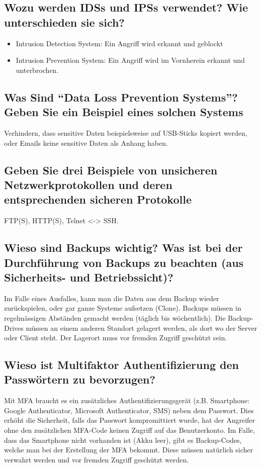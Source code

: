 \subsection*{Wozu werden IDSs und IPSs verwendet? Wie unterschieden sie sich?}
\begin{itemize}
    \item Intrusion Detection System: Ein Angriff wird erkannt und geblockt
    \item Intrusion Prevention System: Ein Angriff wird im Vornherein erkannt und unterbrochen.
\end{itemize}

\subsection*{Was Sind "`Data Loss Prevention Systems"'? Geben Sie ein Beispiel eines solchen Systems}
Verhindern, dass sensitive Daten beispielsweise auf USB-Sticks kopiert werden, oder Emails keine sensitive Daten als Anhang haben.

\subsection*{Geben Sie drei Beispiele von unsicheren Netzwerkprotokollen und deren entsprechenden sicheren Protokolle}
FTP(S), HTTP(S), Telnet <-> SSH.

\subsection*{Wieso sind Backups wichtig? Was ist bei der Durchführung von Backups zu beachten (aus Sicherheits- und Betriebssicht)?}
Im Falle eines Ausfalles, kann man die Daten aus dem Backup wieder zurückspielen, oder gar ganze Systeme aufsetzen (Clone). Backups müssen in regelmässigen Abständen gemacht werden (täglich bis wöchentlich). Die Backup-Drives müssen an einem anderen Standort gelagert werden, als dort wo der Server oder Client steht. Der Lagerort muss vor fremden Zugriff geschützt sein.

\subsection*{Wieso ist Multifaktor Authentifizierung den Passwörtern zu bevorzugen?}
Mit MFA braucht es ein zusätzliches Authentifizierungsgerät (z.B. Smartphone: Google Authenticator, Microsoft Authenticator, SMS) neben dem Passwort. Dies erhöht die Sicherheit, falls das Passwort kompromittiert wurde, hat der Angreifer ohne den zusätzlichen MFA-Code keinen Zugriff auf das Benutzerkonto. Im Falle, dass das Smartphone nicht vorhanden ist (Akku leer), gibt es Backup-Codes, welche man bei der Erstellung der MFA bekommt. Diese müssen natürlich sicher verwahrt werden und vor fremden Zugriff geschützt werden.

